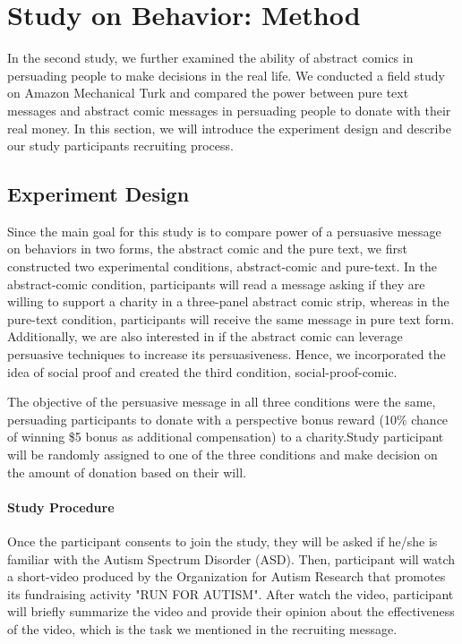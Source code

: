 \section{Study on Behavior: Method}
\label{sec:Method2}

In the second study, we further examined the ability of abstract comics in persuading people to make decisions in the real life. We conducted a field study on Amazon Mechanical Turk and compared the power between pure text messages and abstract comic messages in persuading people to donate with their real money. In this section, we will introduce the experiment design and describe our study participants recruiting process.

\subsection{Experiment Design}
Since the main goal for this study is to compare power of a persuasive message on behaviors in two forms, the abstract comic and the pure text, we first constructed two experimental conditions, abstract-comic and pure-text. In the abstract-comic condition, participants will read a message asking if they are willing to support a charity in a three-panel abstract comic strip, whereas in the pure-text condition, participants will receive the same message in pure text form. Additionally, we are also interested in if the abstract comic can leverage persuasive techniques to increase its persuasiveness. Hence, we incorporated the idea of social proof and created the third condition, social-proof-comic.

The objective of the persuasive message in all three conditions were the same, persuading participants to donate with a perspective bonus reward (10\% chance of winning \$5 bonus as additional compensation) to a charity.Study participant will be randomly assigned to one of the three conditions and make decision on the amount of donation based on their will.

\paragraph{Study Procedure} Once the participant consents to join the study, they will be asked if he/she is familiar with the Autism Spectrum Disorder (ASD). Then, participant will watch a short-video produced by the Organization for Autism Research that promotes its fundraising activity "RUN FOR AUTISM". After watch the video, participant will briefly summarize the video and provide their opinion about the effectiveness of the video, which is the task we mentioned in the recruiting message.

